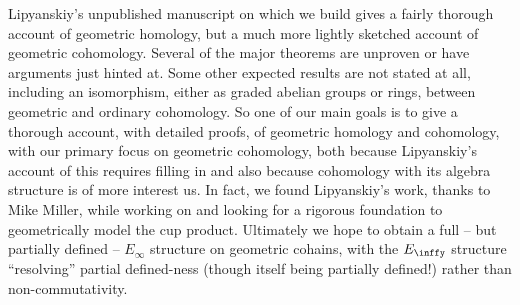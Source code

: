  Lipyanskiy's  unpublished manuscript \cite{Lipy14} on which we build gives a fairly thorough account of geometric homology, 
 but a much more lightly sketched account of geometric cohomology.
Several of the major theorems are unproven or have arguments just hinted at.
Some other expected results are not stated at all, including an isomorphism, either as graded abelian groups or rings, between geometric and ordinary cohomology.
So one of our main goals is to give a thorough account, with detailed proofs, of geometric homology and cohomology, with our primary focus on geometric cohomology, both because Lipyanskiy's account of this requires filling in and also because cohomology with its algebra structure
is of more  interest us.
In fact, we found Lipyanskiy's work, thanks to Mike Miller, while working on \cite{FMS-flows} and looking for a rigorous foundation to geometrically model the cup product.   Ultimately we hope to obtain a full -- but partially defined --  $E_\infty$ structure on geometric cohains, with the $E_\inffy$ structure ``resolving''
partial defined-ness (though itself being partially defined!) rather than non-commutativity.



